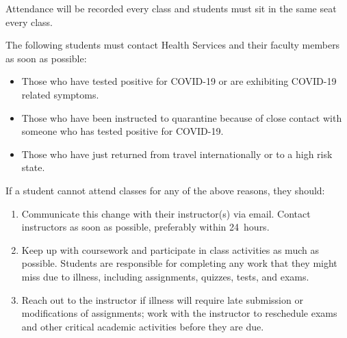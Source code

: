 \documentclass[11pt,letterpaper]{article}
\begin{document}
Attendance will be recorded every class and students must sit in the same seat every class. \pspace

The following students must contact Health Services and their faculty members as soon as possible: 

\begin{itemize}
\item Those who have tested positive for COVID-19 or are exhibiting COVID-19 related symptoms. 

\item Those who have been instructed to quarantine because of close contact with someone who has tested positive for COVID-19.

\item Those who have just returned from travel internationally or to a high risk state.
\end{itemize}

If a student cannot attend classes for any of the above reasons, they should:

\begin{enumerate}[1.]
\item Communicate this change with their instructor(s) via email. Contact instructors as soon as possible, preferably within 24~hours.

\item Keep up with coursework and participate in class activities as much as possible. Students are responsible for completing any work that they might miss due to illness, including assignments, quizzes, tests, and exams.

\item Reach out to the instructor if illness will require late submission or modifications of assignments; work with the instructor to reschedule exams and other critical academic activities before they are due.
\end{enumerate}
\sectionbreak
\end{document}
